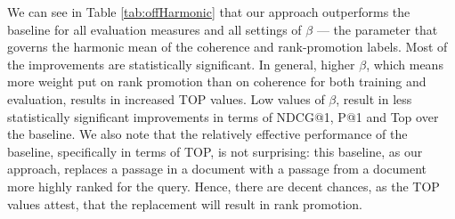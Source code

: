 We can see in Table \ref{tab:offHarmonic}  that our approach outperforms the \random baseline for all
evaluation measures and all settings of $\beta$ --- the parameter that
governs the harmonic mean of the coherence and rank-promotion
labels. Most of the improvements are statistically significant.
In general, higher $\beta$, which means more weight put on rank promotion than on coherence for both training and evaluation, results in increased TOP values. 
Low values of $\beta$, result in 
 less statistically significant improvements in
terms of NDCG@1, P@1 and Top over the \random baseline. We also note
that the relatively effective performance of the \random baseline, specifically in terms of TOP, is
not surprising: this baseline, as our approach, replaces a passage in
a document with a passage from a document more highly ranked for the
query. Hence, there are decent chances, as the TOP values attest, that the replacement will result in rank promotion.




%  

